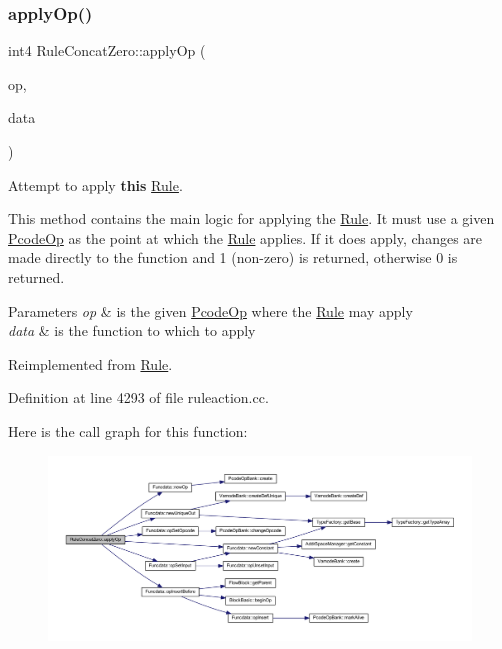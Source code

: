 \subsubsection{\texorpdfstring{applyOp()}{applyOp()}}
{\footnotesize\ttfamily int4 Rule\+Concat\+Zero\+::apply\+Op (\begin{DoxyParamCaption}\item[{\mbox{\hyperlink{class_pcode_op}{Pcode\+Op}} $\ast$}]{op,  }\item[{\mbox{\hyperlink{class_funcdata}{Funcdata}} \&}]{data }\end{DoxyParamCaption})\hspace{0.3cm}{\ttfamily [virtual]}}



Attempt to apply {\bfseries{this}} \mbox{\hyperlink{class_rule}{Rule}}. 

This method contains the main logic for applying the \mbox{\hyperlink{class_rule}{Rule}}. It must use a given \mbox{\hyperlink{class_pcode_op}{Pcode\+Op}} as the point at which the \mbox{\hyperlink{class_rule}{Rule}} applies. If it does apply, changes are made directly to the function and 1 (non-\/zero) is returned, otherwise 0 is returned. 
\begin{DoxyParams}{Parameters}
{\em op} & is the given \mbox{\hyperlink{class_pcode_op}{Pcode\+Op}} where the \mbox{\hyperlink{class_rule}{Rule}} may apply \\
\hline
{\em data} & is the function to which to apply \\
\hline
\end{DoxyParams}


Reimplemented from \mbox{\hyperlink{class_rule_a4e3e61f066670175009f60fb9dc60848}{Rule}}.



Definition at line 4293 of file ruleaction.\+cc.

Here is the call graph for this function\+:
\nopagebreak
\begin{figure}[H]
\begin{center}
\leavevmode
\includegraphics[width=350pt]{class_rule_concat_zero_a0cfa16444e6d4609972b78e5ce83c7e8_cgraph}
\end{center}
\end{figure}
\mbox{\label{class_rule_concat_zero_a7f38ae898d28aa1ae805fc66147fd627}} 
